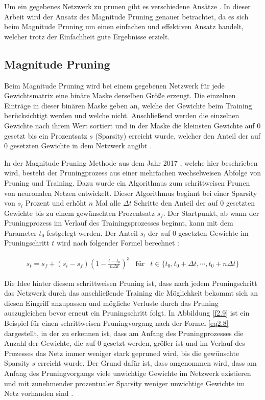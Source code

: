 Um ein gegebenes Netzwerk zu prunen gibt es verschiedene Ansätze \cite{gale_state_2019, mishra_survey_2020}. In dieser Arbeit wird der Ansatz des Magnitude Pruning \cite{zhu_prune_2017} genauer betrachtet, da es sich beim Magnitude Pruning um einen einfachen und effektiven Ansatz handelt, welcher trotz der Einfachheit gute Ergebnisse erzielt.

\subsection{Magnitude Pruning}
\label{magnitude_pruning}
Beim Magnitude Pruning wird bei einem gegebenen Netzwerk für jede Gewichtsmatrix eine binäre Maske derselben Größe erzeugt. Die einzelnen Einträge in dieser binären Maske geben an, welche der Gewichte beim Training berücksichtigt werden und welche nicht. Anschließend werden die einzelnen Gewichte nach ihrem Wert sortiert und in der Maske die kleinsten Gewichte auf 0 gesetzt bis ein Prozentsatz $s$ (Sparsity) erreicht wurde, welcher den Anteil der auf 0 gesetzten Gewichte in dem Netzwerk angibt \cite{zhu_prune_2017}.

In der Magnitude Pruning Methode aus dem Jahr 2017 \cite{zhu_prune_2017}, welche hier beschrieben wird, besteht der Pruningprozess aus einer mehrfachen wechselweisen Abfolge von Pruning und Training. Dazu wurde ein Algorithmus zum schrittweisen Prunen von neuronalen Netzen entwickelt. Dieser Algorithmus beginnt bei einer Sparsity von $s_i$ Prozent und erhöht $n$ Mal alle $\Delta t$ Schritte den Anteil der auf 0 gesetzten Gewichte bis zu einem gewünschten Prozentsatz $s_f$. Der Startpunkt, ab wann der Pruningprozess im Verlauf des Trainingsprozesses beginnt, kann mit dem Parameter $t_0$ festgelegt werden. Der Anteil $s_t$ der auf 0 gesetzten Gewichte im Pruningschritt $t$ wird nach folgender Formel berechnet \cite{zhu_prune_2017}:

\begin{eqnarray}
s_t = s_f + \left( s_i - s_f \right) \left( 1 - \frac{t - t_0}{n \Delta t} \right)^3
& \textrm{für} 
& t \in \{ t_0, t_0 + \Delta t, \cdots, t_0 + n \Delta t \}
\label{eq2.8}
\end{eqnarray}

Die Idee hinter diesem schrittweisen Pruning ist, dass nach jedem Pruningschritt das Netzwerk durch das anschließende Training die Möglichkeit bekommt sich an diesen Eingriff anzupassen und mögliche Verluste durch das Pruning auszugleichen bevor erneut ein Pruningschritt folgt. In Abbildung \ref{f2.9} ist ein Beispiel für einen schrittweisen Pruningvorgang nach der Formel \ref{eq2.8} dargestellt, in der zu erkennen ist, dass am Anfang des Pruningprozesses die Anzahl der Gewichte, die auf 0 gesetzt werden, größer ist und im Verlauf des Prozesses das Netz immer weniger stark gepruned wird, bis die gewünschte Sparsity $s$ erreicht wurde. Der Grund dafür ist, dass angenommen wird, dass am Anfang des Pruningvorgangs viele unwichtige Gewichte im Netzwerk existieren und mit zunehmender prozentualer Sparsity weniger unwichtige Gewichte im Netz vorhanden sind \cite{zhu_prune_2017}.

